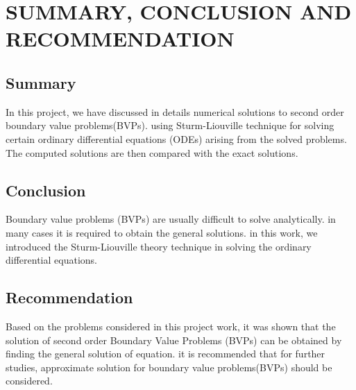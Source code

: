 \documentclass[12pt]{report}
\begin{document}
	\chapter{SUMMARY, CONCLUSION AND RECOMMENDATION}
	
	\section{Summary}
	In this project, we have discussed in details numerical solutions to second order boundary value problems(BVPs). using Sturm-Liouville technique for solving certain ordinary differential equations (ODEs) arising from the solved problems. The computed solutions are then compared with the exact solutions.

	
	\section{Conclusion}
	Boundary value problems (BVPs) are usually difficult to solve analytically. in many cases it is required to obtain the general solutions. in this work, we introduced the Sturm-Liouville theory technique in solving the ordinary differential equations.
	
	\section{Recommendation}
	Based on the problems considered in this project work, it was shown that the solution of second order Boundary  Value Problems (BVPs) can be obtained by finding the general solution of equation. it is recommended that for further studies, approximate solution for boundary value problems(BVPs) should be considered.
	
\end{document}
